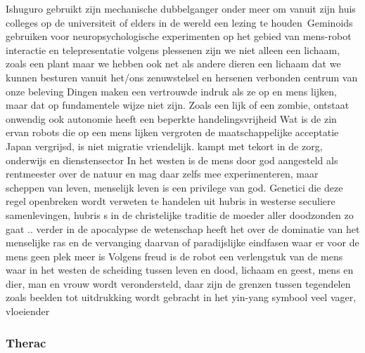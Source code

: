 Ishuguro gebruikt zijn mechanische dubbelganger onder meer om vanuit zijn huis colleges op de universiteit of elders in de wereld een lezing te houden\
Geminoids gebruiken voor neuropsychologische experimenten op het gebied van mens-robot interactie en telepresentatie
volgens plessenen zijn we niet alleen een lichaam, zoals een plant maar we hebben ook net als andere dieren een lichaam dat we kunnen besturen vanuit het/ons zenuwstelsel en hersenen verbonden centrum van onze beleving
Dingen maken een vertrouwde indruk als ze op en mens lijken, maar dat op fundamentele wijze niet zijn. Zoals een lijk of een zombie, ontstaat onwendig
ook autonomie heeft een beperkte handelingsvrijheid
Wat is de zin ervan
robots die op een mens lijken vergroten de maatschappelijke acceptatie
Japan vergrijsd, is niet migratie vriendelijk. kampt met tekort in de zorg, onderwijs en dienstensector
In het westen is de mens door god aangesteld als rentmeester over de natuur en mag daar zelfs mee experimenteren, maar scheppen van leven, menselijk leven is een privilege van god. Genetici die deze regel openbreken wordt verweten te handelen uit hubris in westerse seculiere samenlevingen, hubris s in de christelijke traditie de moeder aller doodzonden
zo gaat .. verder in de apocalypse
de wetenschap heeft het over de dominatie van het menselijke ras en de vervanging daarvan of paradijslijke eindfasen waar er voor de mens geen plek meer is
Volgens freud is de robot een verlengstuk van de mens
waar in het westen de scheiding tussen leven en dood, lichaam en geest, mens en dier, man en vrouw wordt verondersteld, daar zijn de grenzen tussen tegendelen zoals beelden tot uitdrukking wordt gebracht in het yin-yang symbool veel vager, vloeiender

\subsubsection{Therac}


